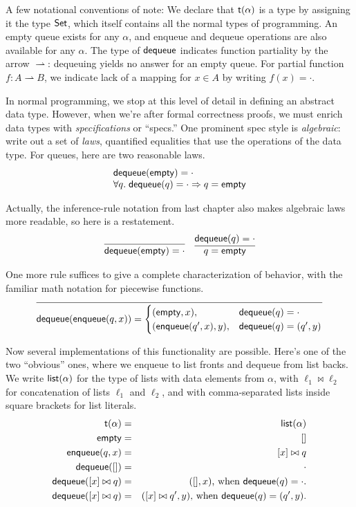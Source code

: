 \documentclass{amsbook}
\theoremstyle{definition}
\theoremstyle{remark}
\numberwithin{section}{chapter}
\numberwithin{equation}{chapter}
\begin{document}
A few notational conventions of note:
We declare that $\mathsf{t}(\alpha)$ is a type by assigning it the type $\mathsf{Set}$, which itself contains all the normal types of programming.
An empty queue exists for any $\alpha$, and enqueue and dequeue operations are also available for any $\alpha$.
The type of $\mathsf{dequeue}$ indicates function partiality by the arrow $\rightharpoonup$: dequeuing yields no answer for an empty queue.
For partial function $f : A \rightharpoonup B$, we indicate lack of a mapping for $x \in A$ by writing $f(x) = \cdot$.

In normal programming, we stop at this level of detail in defining an abstract data type.
However, when we're after formal correctness proofs, we must enrich data types with \emph{specifications} or ``specs.''  
One prominent spec style is \emph{algebraic}: write out a set of \emph{laws}, quantified equalities that use the operations of the data type.
For queues, here are two reasonable laws.
$$\begin{array}{l}
  \mathsf{dequeue}(\mathsf{empty}) = \cdot \\
  \forall q. \; \mathsf{dequeue}(q) = \cdot \Rightarrow q = \mathsf{empty} \\
\end{array}$$

Actually, the inference-rule notation from last chapter also makes algebraic laws more readable, so here is a restatement.
$$\infer{\mt{dequeue}(\mt{empty}) = \cdot}{}
\quad \infer{q = \mt{empty}}{\mt{dequeue}(q) = \cdot}$$

One more rule suffices to give a complete characterization of behavior, with the familiar math notation for piecewise functions.
$$\infer{\mt{dequeue}(\mt{enqueue}(q, x)) = \begin{cases}
    (\mt{empty}, x), & \mt{dequeue}(q) = \cdot \\
    (\mt{enqueue}(q', x), y), & \mt{dequeue}(q) = (q', y)
  \end{cases}}{}$$

\newcommand{\concat}[2]{#1 \bowtie #2}

Now several implementations of this functionality are possible.
Here's one of the two ``obvious'' ones, where we enqueue to list fronts and dequeue from list backs.
We write $\mathsf{list}(\alpha)$ for the type of lists with data elements from $\alpha$, with $\concat{\ell_1}{\ell_2}$ for concatenation of lists $\ell_1$ and $\ell_2$, and with comma-separated lists inside square brackets for list literals.
\begin{eqnarray*}
  \mt{t(\alpha)} &=& \mt{list}(\alpha) \\
  \mt{empty} &=& [] \\
  \mt{enqueue}(q, x) &=& \concat{[x]}{q} \\
  \mt{dequeue}([]) &=& \cdot \\
  \mt{dequeue}(\concat{[x]}{q}) &=& ([], x)\textrm{, when $\mt{dequeue}(q) = \cdot$.} \\
  \mt{dequeue}(\concat{[x]}{q}) &=& (\concat{[x]}{q'}, y)\textrm{, when $\mt{dequeue}(q) = (q', y)$.}
\end{eqnarray*}
\end{document}
